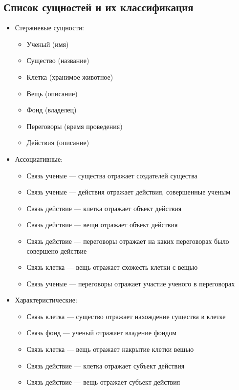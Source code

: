 \subsection{Список сущностей и их классификация}
\begin{itemize}
  \item Стержневые сущности:
        \begin{itemize}
          \item Ученый (имя)
          \item Существо (название)
          \item Клетка (хранимое животное)
          \item Вещь (описание)
          \item Фонд (владелец)
          \item Переговоры (время проведения)
          \item Действия (описание)
        \end{itemize}

  \item Ассоциативные:
        \begin{itemize}
          \item Связь ученые --- существа отражает создателей существа
          \item Связь ученые --- действия отражает действия, совершенные ученым
          \item Связь действие --- клетка отражает объект действия
          \item Связь действие --- вещи отражает объект действия
          \item Связь действие --- переговоры отражает на каких переговорах было совершено действие
          \item Связь клетка --- вещь отражает схожесть клетки с вещью
          \item Связь ученые --- переговоры отражает участие ученого в переговорах
        \end{itemize}

  \item Характеристические:
        \begin{itemize}
          \item Связь клетка --- существо отражает нахождение существа в клетке
          \item Связь фонд --- ученый отражает владение фондом
          \item Связь клетка --- вещь отражает накрытие клетки вещью
          \item Связь действие --- клетка отражает субъект действия
          \item Связь действие --- вещь отражает субъект действия
        \end{itemize}
\end{itemize}


